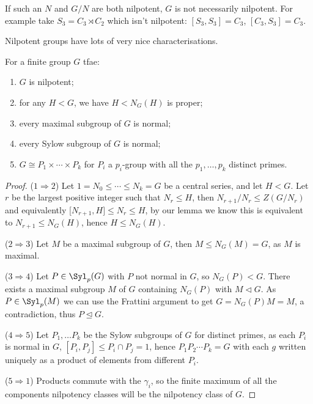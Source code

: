 \documentclass{article}
\begin{document}
If such an $N$ and $G/N$ are both nilpotent, $G$ is not necessarily nilpotent. For example take $S_3=C_3\rtimes C_2$ which isn't nilpotent: $[S_3,S_3]=C_3$, $[C_3,S_3]=C_3$.

Nilpotent groups have lots of very nice characterisations.

\begin{theorem}
    For a finite group $G$ tfae: \begin{enumerate}
        \item $G$ is nilpotent;
        \item for any $H < G$, we have $H < N_G(H)$ is proper;
        \item every maximal subgroup of $G$ is normal;
        \item every Sylow subgroup of $G$ is normal;
        \item $G\cong P_1\times \cdots \times P_k$ for $P_i$ a $p_i$-group with all the $p_1,\ldots,p_k$ distinct primes.
    \end{enumerate}

    \begin{proof}
        ($1\Rightarrow 2$) Let $1=N_0\leq \cdots \leq N_k = G$ be a central series, and let $H < G$. Let $r$ be the largest positive integer such that $N_r\leq H$, then $N_{r+1}/N_r\leq Z(G/N_r)$ and equivalently [$N_{r+1},H]\leq N_r \leq H$, by our lemma we know this is equivalent to $N_{r+1}\leq N_G(H)$, hence $H\leq N_G(H)$.

        ($2\Rightarrow 3$) Let $M$ be a maximal subgroup of $G$, then $M\leq N_G(M)=G$, as $M$ is maximal.

        ($3\Rightarrow 4$) Let $P\in \Syl_p(G)$ with $P$ not normal in $G$, so $N_G(P) < G$. There exists a maximal subgroup $M$ of $G$ containing $N_G(P)$ with $M\lhd G$. As $P\in\Syl_p(M)$ we can use the Frattini argument to get $G=N_G(P)M = M$, a contradiction, thus $P\unlhd G$.

        ($4\Rightarrow 5$) Let $P_1,\ldots P_k$ be the Sylow subgroups of $G$ for distinct primes, as each $P_i$ is normal in $G$, $[P_i,P_j]\leq P_i\cap P_j = 1$, hence $P_1P_2\cdots P_k = G$ with each $g$ written uniquely as a product of elements from different $P_i$.

        ($5\Rightarrow 1$) Products commute with the $\gamma_i$, so the finite maximum of all the components nilpotency classes will be the nilpotency class of $G$.
    \end{proof}
\end{theorem}
\end{document}
